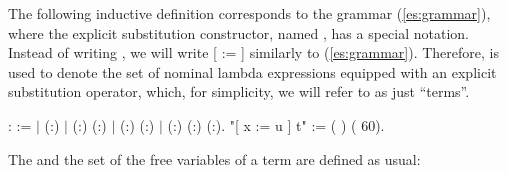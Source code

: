 The following inductive definition corresponds to the grammar (\ref{es:grammar}), where the explicit substitution constructor, named , has a special notation. Instead of writing    , we will write [ := ]  similarly to (\ref{es:grammar}). Therefore,  is used to denote the set of nominal lambda expressions equipped with an explicit substitution operator, which, for simplicity, we will refer to as just ``terms''. 
\begin{coqdoccode}
\coqdocemptyline
\coqdocnoindent
{}  :  :=\coqdoceol
\coqdocindent{0.50em}
\ensuremath{|}  (:)\coqdoceol
\coqdocindent{0.50em}
\ensuremath{|}  (:) (:)\coqdoceol
\coqdocindent{0.50em}
\ensuremath{|}  (:) (:)\coqdoceol
\coqdocindent{0.50em}
\ensuremath{|}  (:) (:) (:).\coqdoceol
\coqdocnoindent
{} "[ x := u ] t" := (   ) (  60).\coqdoceol
\coqdocemptyline
\end{coqdoccode}
The  and the set  of the free variables of a term are defined as usual: 
